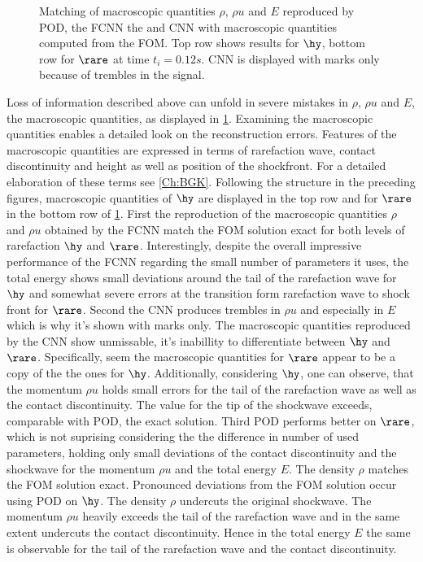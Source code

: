 \begin{figure}[H]
	
	\caption{Matching of macroscopic quantities \(\rho\), \(\rho u\) and \(E\) reproduced by POD, the FCNN the and CNN with macroscopic quantities computed from the FOM. Top row shows results for \(\hy\), bottom row for \(\rare\) at time \(t_i=0.12s\). CNN is displayed with marks only because of trembles in the signal.}
	\label{Fig:ErrMacro}
\end{figure}
Loss of information described above can unfold in severe mistakes in \(\rho\), \(\rho u\) and \(E\), the macroscopic quantities, as displayed in \cref{Fig:ErrMacro}. Examining the macroscopic quantities enables a detailed look on the reconstruction errors. Features of the macroscopic quantities are expressed in terms of rarefaction wave, contact discontinuity and height as well as position of the shockfront. For a detailed elaboration of these terms see \cref{Ch:BGK}. Following the structure in the preceding figures, macroscopic quantities of \(\hy\) are displayed in the top row and for \(\rare\) in the bottom row of \cref{Fig:ErrMacro}. First the reproduction of the macroscopic quantities \(\rho\) and \(\rho u\)  obtained by the FCNN match the FOM solution exact for both levels of rarefaction \(\hy\) and \(\rare\). Interestingly, despite the overall impressive performance of the FCNN regarding the small number of parameters it uses, the total energy shows small deviations around the tail of the rarefaction wave for \(\hy\) and somewhat severe errors at the transition form rarefaction wave to shock front for \(\rare\). Second the CNN produces trembles in \(\rho u\) and especially in \(E\) which is why it's shown with marks only. The macroscopic quantities reproduced by the CNN show unmissable, it's inabillity to differentiate between \(\hy\) and \(\rare\). Specifically, seem the macroscopic quantities for \(\rare\) appear to be a copy of the the ones for \(\hy\). Additionally, considering \(\hy\), one can observe, that the momentum \(\rho u\) holds small errors for the tail of the rarefaction wave as well as the contact discontinuity. The value for the tip of the shockwave exceeds, comparable with POD, the exact solution. Third POD performs better on \(\rare\), which is not suprising considering the the difference in number of used parameters, holding only small deviations of the contact discontinuity and the shockwave for the momentum \(\rho u\) and the total energy \(E\). The density \(\rho\) matches the FOM solution exact. Pronounced deviations from the FOM solution occur using POD on \(\hy\). The density \(\rho\) undercuts the original shockwave. The momentum \(\rho u\) heavily exceeds the tail of the rarefaction wave and in the same extent undercuts the contact discontinuity. Hence in the total energy \(E\) the same is observable for the tail of the rarefaction wave and the contact discontinuity.
